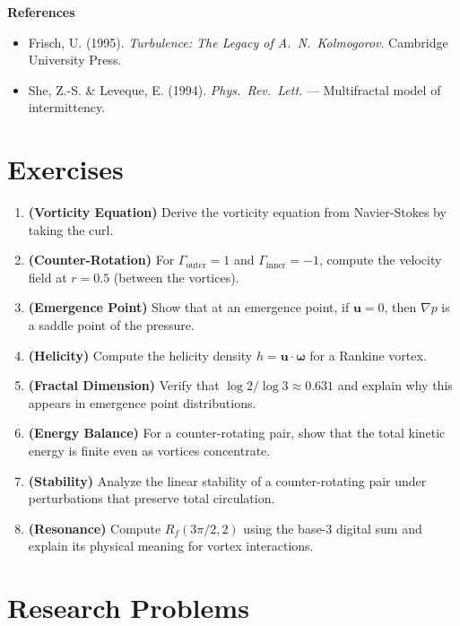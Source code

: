 \textbf{References}
\begin{itemize}
\item Frisch, U. (1995). \textit{Turbulence: The Legacy of A.\ N.\ Kolmogorov}. Cambridge University Press\cite{frisch1995}.
\item She, Z.-S. \& Leveque, E. (1994). \textit{Phys.\ Rev.\ Lett.} — Multifractal model of intermittency\cite{she1994}.
\end{itemize}

\section*{Exercises}

\begin{enumerate}
\item \textbf{(Vorticity Equation)} Derive the vorticity equation from Navier-Stokes by taking the curl.

\item \textbf{(Counter-Rotation)} For $\Gamma_{\text{outer}} = 1$ and $\Gamma_{\text{inner}} = -1$, compute the velocity field at $r = 0.5$ (between the vortices).

\item \textbf{(Emergence Point)} Show that at an emergence point, if $\mathbf{u} = 0$, then $\nabla p$ is a saddle point of the pressure.

\item \textbf{(Helicity)} Compute the helicity density $h = \mathbf{u} \cdot \boldsymbol{\omega}$ for a Rankine vortex.

\item \textbf{(Fractal Dimension)} Verify that $\log 2 / \log 3 \approx 0.631$ and explain why this appears in emergence point distributions.

\item \textbf{(Energy Balance)} For a counter-rotating pair, show that the total kinetic energy is finite even as vortices concentrate.

\item \textbf{(Stability)} Analyze the linear stability of a counter-rotating pair under perturbations that preserve total circulation.

\item \textbf{(Resonance)} Compute $R_f(3\pi/2, 2)$ using the base-3 digital sum and explain its physical meaning for vortex interactions.
\end{enumerate}

\section*{Research Problems}

